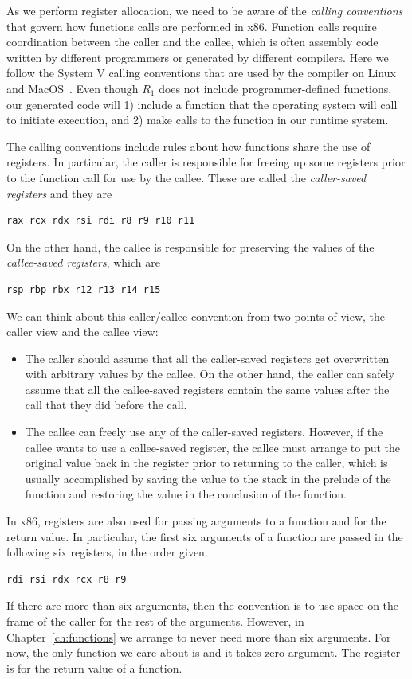 \documentclass[11pt]{book}
\begin{document}
As we perform register allocation, we need to be aware of the
\emph{calling conventions}  that govern how
functions calls are performed in x86. Function calls require
coordination between the caller and the callee, which is often
assembly code written by different programmers or generated by
different compilers. Here we follow the System V calling conventions
that are used by the  compiler on Linux and
MacOS~\citep{Bryant:2005aa,Matz:2013aa}.
%
Even though $R_1$ does not include programmer-defined functions, our
generated code will 1) include a  function that the
operating system will call to initiate execution, and 2) make calls to
the  function in our runtime system.

The calling conventions include rules about how functions share the
use of registers. In particular, the caller is responsible for freeing
up some registers prior to the function call for use by the callee.
These are called the \emph{caller-saved registers}
and they are
\begin{lstlisting}
rax rcx rdx rsi rdi r8 r9 r10 r11
\end{lstlisting}
On the other hand, the callee is responsible for preserving the values
of the \emph{callee-saved registers}, 
which are
\begin{lstlisting}
rsp rbp rbx r12 r13 r14 r15
\end{lstlisting}

We can think about this caller/callee convention from two points of
view, the caller view and the callee view:
\begin{itemize}
\item The caller should assume that all the caller-saved registers get
  overwritten with arbitrary values by the callee.  On the other hand,
  the caller can safely assume that all the callee-saved registers
  contain the same values after the call that they did before the
  call.
\item The callee can freely use any of the caller-saved registers.
  However, if the callee wants to use a callee-saved register, the
  callee must arrange to put the original value back in the register
  prior to returning to the caller, which is usually accomplished by
  saving the value to the stack in the prelude of the function and
  restoring the value in the conclusion of the function.
\end{itemize}

In x86, registers are also used for passing arguments to a function
and for the return value.  In particular, the first six arguments of a
function are passed in the following six registers, in the order
given.
\begin{lstlisting}
rdi rsi rdx rcx r8 r9
\end{lstlisting}
If there are more than six arguments, then the convention is to use
space on the frame of the caller for the rest of the
arguments. However, in Chapter~\ref{ch:functions} we arrange to never
need more than six arguments. For now, the only function we care about
is  and it takes zero argument.
%
The register  is for the return value of a function.
\end{document}
